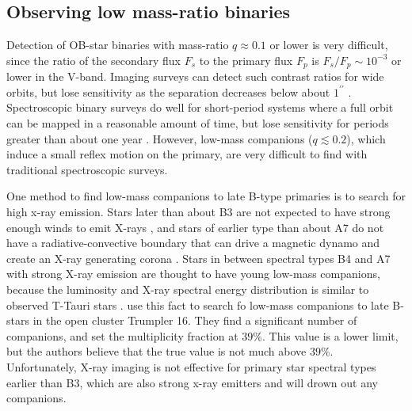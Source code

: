 \subsection{Observing low mass-ratio binaries}
\label{paper1_sec:otherobs}
Detection of OB-star binaries with mass-ratio $q \approx 0.1$ or lower is very
difficult, since the ratio of the secondary flux $F_s$ to the primary
flux $F_p$ is $F_s/F_p \sim 10^{-3}$ or lower in the V-band. Imaging surveys
can detect such contrast ratios for wide orbits, but lose sensitivity
as the separation decreases below about $1^{\prime\prime}$
\citep[e.g.][]{Maiz2010}. Spectroscopic binary surveys do well for
short-period systems where a full orbit can be mapped in a reasonable
amount of time, but lose sensitivity for periods greater than about one year
\citep[e.g.][]{Sana2009, Evans2010}. However, low-mass companions ($q \lesssim
0.2$), which induce a small reflex motion on the primary, are very difficult to find with
traditional spectroscopic surveys.

One method to find low-mass companions to late B-type primaries is to
search for high x-ray emission. Stars later than about B3 are not
expected to have strong enough winds to emit X-rays
\citep{Gagne1997}, and stars of earlier type than about A7 do not have
a radiative-convective boundary that can drive a magnetic dynamo and
create an X-ray generating corona \citep{Schmitt1997}. Stars in
between spectral types B4 and A7 with strong X-ray emission are
thought to have young low-mass companions, because the luminosity and
X-ray spectral energy distribution is similar to observed T-Tauri
stars \citep{Huelamo2000}. \cite{Evans2011} use this fact to search fo
low-mass companions to late B-stars in the open cluster Trumpler
16. They find a significant number of 
companions, and set the multiplicity fraction at $39\%$. This value is
a lower limit, but the authors believe that the true value is not much
above $39\%$.  Unfortunately, X-ray imaging is not effective for
primary star spectral types earlier than B3, which are also strong
x-ray emitters \citep{Gagne1997} and will drown out any companions.


